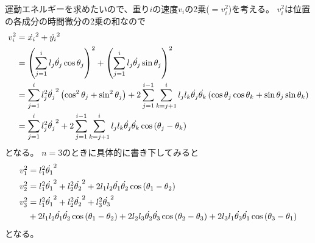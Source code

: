 \documentclass{jsarticle}
\newcommand{\eqa}[1]{\begin{align}#1\end{align}}
\newcommand{\cost}[2]{\cos\left(\theta_{#1}-\theta_{#2}\right)}
\newcommand{\dott}[1]{\dot{\theta_{#1}}}
\begin{document}
運動エネルギーを求めたいので、重り$i$の速度$v_i$の2乗($=v_i^2$)を考える。
$v_i^2$は位置の各成分の時間微分の2乗の和なので
\eqa{
	v_i^2 &= \dot{x_i}^2 + \dot{y_i}^2 \notag\\
		&= \left(\sum_{j=1}^i l_j \dott{j} \cos\theta_j\right)^2
			+ \left(\sum_{j=1}^i l_j \dott{j} \sin\theta_j\right)^2 \notag\\
		&= \sum_{j=1}^i l_j^2 \dott{j}^2 \left(\cos^2\theta_j + \sin^2\theta_j\right)
			+ 2\sum_{j=1}^{i-1} \sum_{k=j+1}^i l_j l_k \dott{j} \dott{k}
				\left(\cos\theta_j\cos\theta_k + \sin\theta_j\sin\theta_k\right) \notag\\
		&= \sum_{j=1}^i l_j^2 \dott{j}^2
			+ 2\sum_{j=1}^{i-1} \sum_{k=j+1}^i l_j l_k \dott{j} \dott{k} \cost{j}{k}
}
となる。
$n=3$のときに具体的に書き下してみると
\eqa{
	v_1^2 &= l_1^2 \dott{1}^2 \notag\\
	v_2^2 &= l_1^2 \dott{1}^2 + l_2^2 \dott{2}^2
		+ 2 l_1 l_2 \dott{1} \dott{2} \cos\left(\theta_1-\theta_2\right) \notag\\
	v_3^2 &= l_1^2 \dott{1}^2 + l_2^2 \dott{2}^2 + l_3^2 \dott{3}^2 \notag\\
		&+ 2 l_1 l_2 \dott{1} \dott{2} \cost{1}{2}
		+ 2 l_2 l_3 \dott{2} \dott{3} \cost{2}{3}
		+ 2 l_3 l_1 \dott{3} \dott{1} \cost{3}{1} \notag
}
となる。
\end{document}

